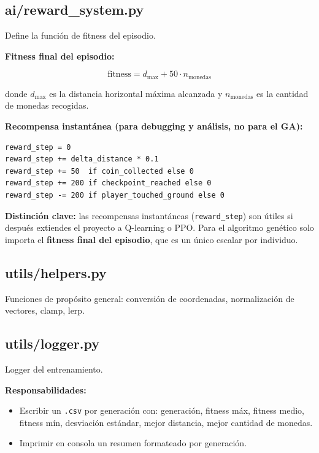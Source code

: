 \documentclass[11pt,a4paper]{article}
\begin{document}
\subsection{ai/reward\_system.py}

Define la función de fitness del episodio.

\textbf{Fitness final del episodio:}

\[
\text{fitness} = d_{\max} + 50 \cdot n_{\text{monedas}}
\]

donde $d_{\max}$ es la distancia horizontal máxima alcanzada y $n_{\text{monedas}}$ es la cantidad de monedas recogidas.

\textbf{Recompensa instantánea (para debugging y análisis, no para el GA):}

\begin{lstlisting}
reward_step = 0
reward_step += delta_distance * 0.1
reward_step += 50  if coin_collected else 0
reward_step += 200 if checkpoint_reached else 0
reward_step -= 200 if player_touched_ground else 0
\end{lstlisting}

\begin{notabox}
\textbf{Distinción clave:} las recompensas instantáneas (\texttt{reward\_step}) son útiles si después extiendes el proyecto a Q-learning o PPO. Para el algoritmo genético solo importa el \textbf{fitness final del episodio}, que es un único escalar por individuo.
\end{notabox}

\subsection{utils/helpers.py}

Funciones de propósito general: conversión de coordenadas, normalización de vectores, clamp, lerp.

\subsection{utils/logger.py}

Logger del entrenamiento.

\textbf{Responsabilidades:}
\begin{itemize}
    \item Escribir un \texttt{.csv} por generación con: generación, fitness máx, fitness medio, fitness mín, desviación estándar, mejor distancia, mejor cantidad de monedas.
    \item Imprimir en consola un resumen formateado por generación.
\end{itemize}
\end{document}
